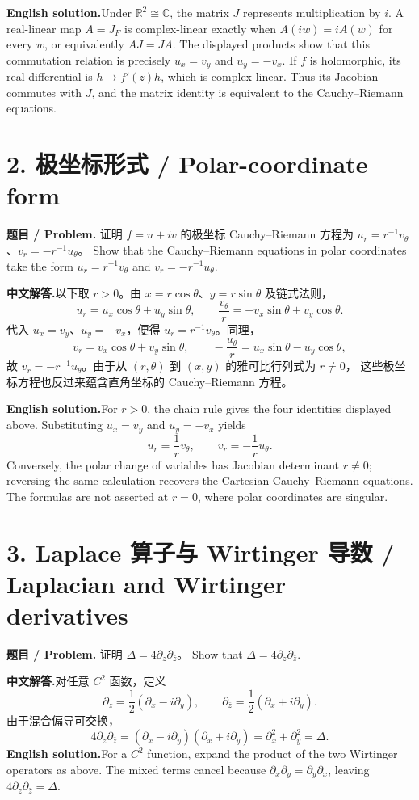 \documentclass[11pt,a4paper]{ctexart}
\newcommand{\C}{\mathbb C}
\newcommand{\R}{\mathbb R}
\newcommand{\CN}{\textbf{中文解答.}\enspace}
\newcommand{\EN}{\textbf{English solution.}\enspace}
\begin{document}
\EN Under $\R^2\cong\C$, the matrix $J$ represents multiplication by $i$.
A real-linear map $A=J_F$ is complex-linear exactly when $A(iw)=iA(w)$ for every $w$,
or equivalently $AJ=JA$. The displayed products show that this commutation relation is
precisely $u_x=v_y$ and $u_y=-v_x$. If $f$ is holomorphic, its real differential is
$h\mapsto f'(z)h$, which is complex-linear. Thus its Jacobian commutes with $J$,
and the matrix identity is equivalent to the Cauchy--Riemann equations.

\section*{2. 极坐标形式 / Polar-coordinate form}
\textbf{题目 / Problem.} 证明 $f=u+iv$ 的极坐标 Cauchy--Riemann 方程为
$u_r=r^{-1}v_\theta$、$v_r=-r^{-1}u_\theta$。
Show that the Cauchy--Riemann equations in polar coordinates take the form
$u_r=r^{-1}v_\theta$ and $v_r=-r^{-1}u_\theta$.

\CN 以下取 $r>0$。由 $x=r\cos\theta$、$y=r\sin\theta$ 及链式法则，
\[
 u_r=u_x\cos\theta+u_y\sin\theta,
 \qquad \frac{v_\theta}{r}=-v_x\sin\theta+v_y\cos\theta.
\]
代入 $u_x=v_y$、$u_y=-v_x$，便得 $u_r=r^{-1}v_\theta$。同理，
\[
 v_r=v_x\cos\theta+v_y\sin\theta,
 \qquad -\frac{u_\theta}{r}=u_x\sin\theta-u_y\cos\theta,
\]
故 $v_r=-r^{-1}u_\theta$。由于从 $(r,\theta)$ 到 $(x,y)$ 的雅可比行列式为 $r\ne0$，
这些极坐标方程也反过来蕴含直角坐标的 Cauchy--Riemann 方程。

\EN For $r>0$, the chain rule gives the four identities displayed above.
Substituting $u_x=v_y$ and $u_y=-v_x$ yields
\[
 \boxed{\displaystyle u_r=\frac1r v_\theta,\qquad
 v_r=-\frac1r u_\theta.}
\]
Conversely, the polar change of variables has Jacobian determinant $r\ne0$;
reversing the same calculation recovers the Cartesian Cauchy--Riemann equations.
The formulas are not asserted at $r=0$, where polar coordinates are singular.

\section*{3. Laplace 算子与 Wirtinger 导数 / Laplacian and Wirtinger derivatives}
\textbf{题目 / Problem.} 证明 $\Delta=4\partial_z\partial_{\bar z}$。
Show that $\Delta=4\partial_z\partial_{\bar z}$.

\CN 对任意 $C^2$ 函数，定义
\[
 \partial_z=\frac12(\partial_x-i\partial_y),\qquad
 \partial_{\bar z}=\frac12(\partial_x+i\partial_y).
\]
由于混合偏导可交换，
\[
 4\partial_z\partial_{\bar z}
 =(\partial_x-i\partial_y)(\partial_x+i\partial_y)
 =\partial_x^2+\partial_y^2=\Delta.
\]
\EN For a $C^2$ function, expand the product of the two Wirtinger operators as above.
The mixed terms cancel because $\partial_x\partial_y=\partial_y\partial_x$,
leaving $4\partial_z\partial_{\bar z}=\Delta$.
\end{document}
